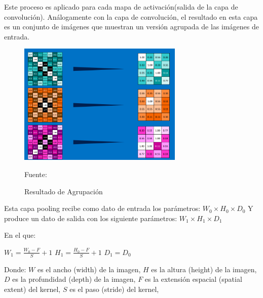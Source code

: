 		Este proceso es aplicado para cada mapa de activación(salida de la capa de convolución). Análogamente con la capa de convolución, el resultado en esta capa es un conjunto de imágenes que muestran un versión agrupada de las imágenes de entrada.

		\begin{figure}[H]
		\begin{center}
		\includegraphics[width=0.7\textwidth]{images/marcoteorico/pool2}
		\end{center}
		\begin{center}
		\caption{\small{Resultado de Agrupación}}
		\vskip -0.2cm  
		{\small{Fuente: \cite{Rohrer}}}
		\end{center}
		\vspace{-1.5em}
		\end{figure}


		\noindent Esta capa pooling recibe como dato de entrada los parámetros:
		${W_{0}}\times{H_{0}}\times{D_{0}}$ \newline
		Y produce un dato de salida con los siguiente parámetros: ${W_{1}}\times{H_{1}}\times{D_{1}}$\newline
		
		\begin{minipage}[t]{0.5\textwidth}
		En el que:
		\begin{center}
		 ${W_{1}} = \frac{{W_{0}} - F }{S} +1$ 
		\vskip 0.4cm 
		 ${H_{1}} = \frac{{H_{0}} - F }{S} +1$ 
		\vskip 0.4cm 
		 ${D_{1}} = {D_{0}}$ 
		 \end{center}
		\vskip 0.6cm 
		\end{minipage}
		\begin{minipage}[t]{0.55\textwidth}
		Donde:
		\vskip 0.1cm 
		$W$ es el ancho (width) de la imagen, \vskip 0.4cm  
		$H$ es la altura (height) de la imagen,\vskip 0.4cm 
		$D$ es la profundidad (depth) de la imagen,\vskip 0.4cm 
		$F$ es la extensión espacial (spatial extent) del kernel,\vskip 0.4cm 
		$S$ es el paso (stride) del kernel,\vskip 0.4cm 
		\end{minipage}

